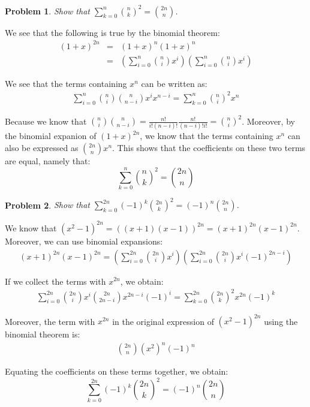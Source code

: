 \documentclass[psamsfonts]{amsart}
\newtheorem{prob}{Problem}[section]
\newenvironment{sol}{{\bfseries Solution}}{\qedsymbol}
\theoremstyle{definition}
\theoremstyle{remark}
\numberwithin{equation}{section}
\begin{document}
\begin{prob}
Show that $\sum_{k=0}^n {n \choose k}^2 = { 2n \choose n }$. 
\end{prob}

\begin{sol}
We see that the following is true by the binomial theorem:
\begin{eqnarray}
(1+x)^{2n} &=& (1+x)^n (1+x)^n \\
&=& \left( \sum_{i=0}^n {n \choose i} x^i \right) \left( \sum_{i=0}^n {n \choose i} x^i \right) 
\end{eqnarray}

We see that the terms containing $x^n$ can be written as:
\begin{eqnarray}
\sum_{i=0}^n {n \choose i} {n \choose n - i} x^i x^{n - i} = \sum_{k =0}^n {n \choose i}^2 x^n
\end{eqnarray}

Because we know that ${n \choose i} {n \choose n - i} = \frac{n!}{i! (n - i)!} \frac{ n!}{(n-i)! i!} = {n \choose i}^2$. Moreover, by the binomial expanion of $(1+x)^{2n}$, we know that the terms containing $x^n$ can also be expressed as ${2n \choose n} x^{n}$. This shows that the coefficients on these two terms are equal, namely that:
\begin{equation}
\sum_{k=0}^n {n \choose k}^2 = { 2n \choose n }
\end{equation}
\end{sol}

\begin{prob}
Show that $\sum_{k=0}^{2n} (-1)^k {2n \choose k}^2 = (-1)^n {2n \choose n}$. 
\end{prob}

\begin{sol}
We know that $(x^2 - 1)^{2n} = ((x+1)(x-1))^{2n} = (x+1)^{2n}(x-1)^{2n}$. Moreover, we can use binomial expansions:
\begin{eqnarray}
(x+1)^{2n}(x-1)^{2n} = \left( \sum_{i=0}^{2n} {2n \choose i} x^i \right) \left( \sum_{i=0}^{2n} {2n \choose i} x^i (-1)^{2n - i} \right) 
\end{eqnarray}

If we collect the terms with $x^{2n}$, we obtain:
\begin{eqnarray}
\sum_{i=0}^{2n} { 2n \choose i} x^i {2n \choose 2n - i} x^{2n - i} (-1)^i = \sum_{k=0}^{2n} {2n \choose k}^2 x^{2n} (-1)^k
\end{eqnarray}

Moreover, the term with $x^{2n}$ in the original expression of $(x^2 - 1)^{2n}$ using the binomial theorem is:
\begin{eqnarray}
{2n \choose n} (x^2)^n (-1)^n 
\end{eqnarray}

Equating the coefficients on these terms together, we obtain:
\begin{equation}
\sum_{k=0}^{2n} (-1)^k {2n \choose k}^2 = (-1)^n {2n \choose n}
\end{equation}
\end{sol}
\end{document}
